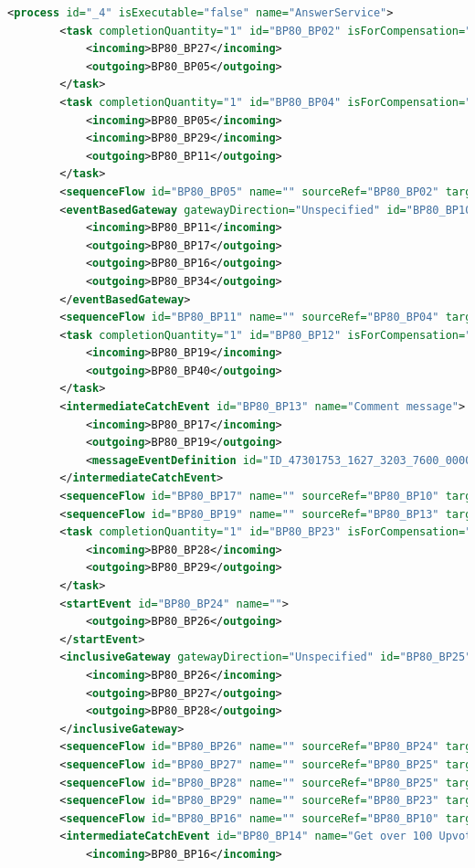 \documentclass[runningheads]{llncs}
\begin{document}
	\begin{lstlisting}[language={XML}]
		<process id="_4" isExecutable="false" name="AnswerService">
		<task completionQuantity="1" id="BP80_BP02" isForCompensation="false" name="View recommended question" startQuantity="1">
			<incoming>BP80_BP27</incoming>
			<outgoing>BP80_BP05</outgoing>
		</task>
		<task completionQuantity="1" id="BP80_BP04" isForCompensation="false" name="Add answer" startQuantity="1">
			<incoming>BP80_BP05</incoming>
			<incoming>BP80_BP29</incoming>
			<outgoing>BP80_BP11</outgoing>
		</task>
		<sequenceFlow id="BP80_BP05" name="" sourceRef="BP80_BP02" targetRef="BP80_BP04" />
		<eventBasedGateway gatewayDirection="Unspecified" id="BP80_BP10" instantiate="false" name="">
			<incoming>BP80_BP11</incoming>
			<outgoing>BP80_BP17</outgoing>
			<outgoing>BP80_BP16</outgoing>
			<outgoing>BP80_BP34</outgoing>
		</eventBasedGateway>
		<sequenceFlow id="BP80_BP11" name="" sourceRef="BP80_BP04" targetRef="BP80_BP10" />
		<task completionQuantity="1" id="BP80_BP12" isForCompensation="false" name="Reply the comment" startQuantity="1">
			<incoming>BP80_BP19</incoming>
			<outgoing>BP80_BP40</outgoing>
		</task>
		<intermediateCatchEvent id="BP80_BP13" name="Comment message">
			<incoming>BP80_BP17</incoming>
			<outgoing>BP80_BP19</outgoing>
			<messageEventDefinition id="ID_47301753_1627_3203_7600_000000200121" />
		</intermediateCatchEvent>
		<sequenceFlow id="BP80_BP17" name="" sourceRef="BP80_BP10" targetRef="BP80_BP13" />
		<sequenceFlow id="BP80_BP19" name="" sourceRef="BP80_BP13" targetRef="BP80_BP12" />
		<task completionQuantity="1" id="BP80_BP23" isForCompensation="false" name="Receive invitatioin of Answering question" startQuantity="1">
			<incoming>BP80_BP28</incoming>
			<outgoing>BP80_BP29</outgoing>
		</task>
		<startEvent id="BP80_BP24" name="">
			<outgoing>BP80_BP26</outgoing>
		</startEvent>
		<inclusiveGateway gatewayDirection="Unspecified" id="BP80_BP25" name="">
			<incoming>BP80_BP26</incoming>
			<outgoing>BP80_BP27</outgoing>
			<outgoing>BP80_BP28</outgoing>
		</inclusiveGateway>
		<sequenceFlow id="BP80_BP26" name="" sourceRef="BP80_BP24" targetRef="BP80_BP25" />
		<sequenceFlow id="BP80_BP27" name="" sourceRef="BP80_BP25" targetRef="BP80_BP02" />
		<sequenceFlow id="BP80_BP28" name="" sourceRef="BP80_BP25" targetRef="BP80_BP23" />
		<sequenceFlow id="BP80_BP29" name="" sourceRef="BP80_BP23" targetRef="BP80_BP04" />
		<sequenceFlow id="BP80_BP16" name="" sourceRef="BP80_BP10" targetRef="BP80_BP14" />
		<intermediateCatchEvent id="BP80_BP14" name="Get over 100 Upvoted">
			<incoming>BP80_BP16</incoming>

\end{lstlisting}
\end{document}

